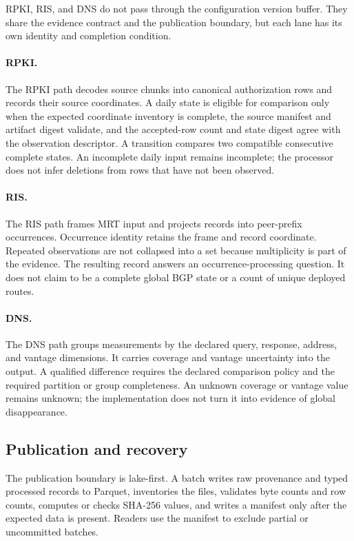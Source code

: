 \documentclass[a4paper,11pt]{article}
\begin{document}
RPKI, RIS, and DNS do not pass through the configuration version buffer. They share the evidence contract and the publication boundary, but each lane has its own identity and completion condition.

\paragraph{RPKI.}
The RPKI path decodes source chunks into canonical authorization rows and records their source coordinates. A daily state is eligible for comparison only when the expected coordinate inventory is complete, the source manifest and artifact digest validate, and the accepted-row count and state digest agree with the observation descriptor. A transition compares two compatible consecutive complete states. An incomplete daily input remains incomplete; the processor does not infer deletions from rows that have not been observed.

\paragraph{RIS.}
The RIS path frames MRT input and projects records into peer-prefix occurrences. Occurrence identity retains the frame and record coordinate. Repeated observations are not collapsed into a set because multiplicity is part of the evidence. The resulting record answers an occurrence-processing question. It does not claim to be a complete global BGP state or a count of unique deployed routes.

\paragraph{DNS.}
The DNS path groups measurements by the declared query, response, address, and vantage dimensions. It carries coverage and vantage uncertainty into the output. A qualified difference requires the declared comparison policy and the required partition or group completeness. An unknown coverage or vantage value remains unknown; the implementation does not turn it into evidence of global disappearance.

\subsection{Publication and recovery}

The publication boundary is lake-first. A batch writes raw provenance and typed processed records to Parquet, inventories the files, validates byte counts and row counts, computes or checks SHA-256 values, and writes a manifest only after the expected data is present. Readers use the manifest to exclude partial or uncommitted batches.
\end{document}

